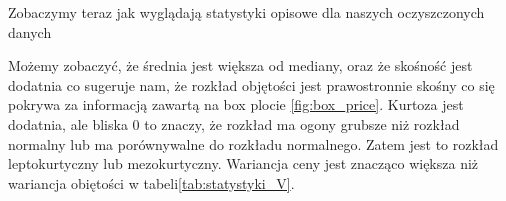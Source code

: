 \documentclass[12pt]{article}
\theoremstyle{exer}
\begin{document}
		Zobaczymy teraz jak wyglądają statystyki opisowe dla naszych oczyszczonych danych
	
	\begin{table}[H]
		\caption{Podstawowe statystyki opisowe dla objętości}
		\label{tab:statystyki_price}
	\end{table}
	Możemy zobaczyć, że średnia jest większa od mediany, oraz że skośność jest dodatnia co sugeruje nam, że rozkład objętości jest prawostronnie skośny co się pokrywa za informacją zawartą na box plocie \ref{fig:box_price}. Kurtoza jest dodatnia, ale bliska $0$ to znaczy, że rozkład ma ogony grubsze niż rozkład normalny lub ma porównywalne do rozkładu normalnego. Zatem jest to rozkład leptokurtyczny lub mezokurtyczny. Wariancja ceny jest znacząco większa niż wariancja obiętości w tabeli\ref{tab:statystyki_V}.  
	
\end{document}
